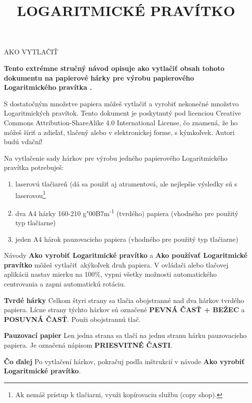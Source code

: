 
\newcommand{\makefulltitle}{Ako vytlačiť Logaritmické pravítko }



\title{\fontsize{60}{60}\selectfont LOGARITMICKÉ PRAVÍTKO}
\preauthor{}\postauthor{}\author{}
\predate{}\postdate{}\date{}


  \begin{center}
    \headingfont\fontsize{20}{20}\selectfont AKO VYTLAČIŤ
  \end{center}

  {\let\newpage\relax\maketitle}%
  \nosection{}
  \large\textbf{\makeperex Tento extrémne stručný návod opisuje ako vytlačiť obsah tohoto dokumentu na papierové hárky pre výrobu papierového Logaritmického pravítka \modelname.}

  \begin{multicols*}{3}
  \normalsize{

  S dostatočným množstve papiera môžeš vytlačiť a vyrobiť nekonečné množstvo Logaritmických pravítok. Tento dokument je poskytnutý pod licenciou Creative Commons Attribution-ShareAlike 4.0 International License, čo znamená, že ho môžeš šíriť a zdieľať, tlačený alebo v elektronickej forme, s kýmkoľvek. Autori budú vďační!

  Na vytlačenie sady hárkov pre výrobu jedného papierového Logaritmického pravítka potrebuješ:
    \begin{enumerate}
      \setlength{\parskip}{0pt}
      \setlength{\parsep}{0pt}
      \item laserovú tlačiareň (dá sa použiť aj atramentová, ale nejlepšie výsledky sú s laserovou\footnote{Ak nemáš prístup k tlačiarni, využi kopírovaciu službu (copy shop).}
      \item dva A4 hárky 160-210 g{\char"00B7}m\textsuperscript{-1} (tvrdého) papiera (vhodného pre použitý typ tlačiarne)
      \item jeden A4 hárok pauzovacieho papiera (vhodného pre použitý typ tlačiarne)
    \end{enumerate}

  Návody \textbf{Ako vyrobiť Logaritmické pravítko} a \textbf{Ako používať Logaritmické pravítko} môžeš vytlačiť akýkoľvek druh papiera. V ovládači alebo tlačovej aplikácii nastav mierku na 100\%, vypni všetky možnosti automatického centrovania a zapni automatickú rotáciu.

  \textbf{Tvrdé hárky}
Celkom štyri strany sa tlačia obojstranné nad dva hárkov tvrdého papiera. Lícne strany týchto hárkov sú označené \textbf{PEVNÁ ČASŤ + BEŽEC} a \textbf{POSUVNÁ ČASŤ}. Použi obojstrannú tlač.

  \textbf{Pauzovací papier}
Len jedna strana sa tlačí na jednu stranu hárku pauzovacieho papiera. Je označená nápisom \textbf{PRIESVITNÉ ČASTI}.

  \textbf{Čo ďalej}
Po vytlačení hárkov, pokračuj podľa inštrukcií v návode \textbf{Ako vyrobiť Logaritmické pravítko}.

  }
  \end{multicols*}
  

